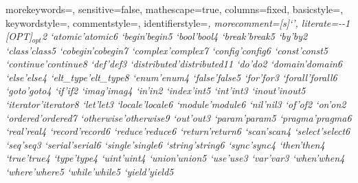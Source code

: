   {
    morekeywords={},
    sensitive=false,
    mathescape=true,
    columns=fixed,
    basicstyle=\footnotesize,
    keywordstyle=\footnotesize,
    commentstyle=\footnotesize\ttfamily,
    identifierstyle=\footnotesize\itshape,
    morecomment=[s]{`}{'},
    literate={-}{{\ttfamily -}}{1}
             {[OPT]}{{{\scriptsize $_{opt}$}}}{2}
             {`atomic'}{{\ttfamily atomic}}{6}
             {`begin'}{{\ttfamily begin}}{5}
             {`bool'}{{\ttfamily bool}}{4}
             {`break'}{{\ttfamily break}}{5}
             {`by'}{{\ttfamily by}}{2}
             {`class'}{{\ttfamily class}}{5}
             {`cobegin'}{{\ttfamily cobegin}}{7}
             {`complex'}{{\ttfamily complex}}{7}
             {`config'}{{\ttfamily config}}{6}
             {`const'}{{\ttfamily const}}{5}
             {`continue'}{{\ttfamily continue}}{8}
             {`def'}{{\ttfamily def}}{3}
             {`distributed'}{{\ttfamily distributed}}{11}
             {`do'}{{\ttfamily do}}{2}
             {`domain'}{{\ttfamily domain}}{6}
             {`else'}{{\ttfamily else}}{4}
             {`elt_type'}{{\ttfamily elt\_type}}{8}
             {`enum'}{{\ttfamily enum}}{4}
             {`false'}{{\ttfamily false}}{5}
             {`for'}{{\ttfamily for}}{3}
             {`forall'}{{\ttfamily forall}}{6}
             {`goto'}{{\ttfamily goto}}{4}
             {`if'}{{\ttfamily if}}{2}
             {`imag'}{{\ttfamily imag}}{4}
             {`in'}{{\ttfamily in}}{2}
             {`index'}{{\ttfamily int}}{5}
             {`int'}{{\ttfamily int}}{3}
             {`inout'}{{\ttfamily inout}}{5}
             {`iterator'}{{\ttfamily iterator}}{8}
             {`let'}{{\ttfamily let}}{3}
             {`locale'}{{\ttfamily locale}}{6}
             {`module'}{{\ttfamily module}}{6}
             {`nil'}{{\ttfamily nil}}{3}
             {`of'}{{\ttfamily of}}{2}
             {`on'}{{\ttfamily on}}{2}
             {`ordered'}{{\ttfamily ordered}}{7}
             {`otherwise'}{{\ttfamily otherwise}}{9}
             {`out'}{{\ttfamily out}}{3}
             {`param'}{{\ttfamily param}}{5}
             {`pragma'}{{\ttfamily pragma}}{6}
             {`real'}{{\ttfamily real}}{4}
             {`record'}{{\ttfamily record}}{6}
             {`reduce'}{{\ttfamily reduce}}{6}
             {`return'}{{\ttfamily return}}{6}
             {`scan'}{{\ttfamily scan}}{4}
             {`select'}{{\ttfamily select}}{6}
             {`seq'}{{\ttfamily seq}}{3}
             {`serial'}{{\ttfamily serial}}{6}
             {`single'}{{\ttfamily single}}{6}
             {`string'}{{\ttfamily string}}{6}
             {`sync'}{{\ttfamily sync}}{4}
             {`then'}{{\ttfamily then}}{4}
             {`true'}{{\ttfamily true}}{4}
             {`type'}{{\ttfamily type}}{4}
             {`uint'}{{\ttfamily uint}}{4}
             {`union'}{{\ttfamily union}}{5}
             {`use'}{{\ttfamily use}}{3}
             {`var'}{{\ttfamily var}}{3}
             {`when'}{{\ttfamily when}}{4}
             {`where'}{{\ttfamily where}}{5}
             {`while'}{{\ttfamily while}}{5}
             {`yield'}{{\ttfamily yield}}{5}
  }


\newcommand{\sntx}[1]{\lstinline[language=syntax]!#1!}
